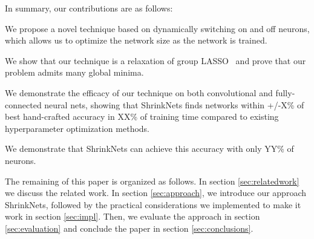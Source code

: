 In summary, our contributions are as follows: 
\begin{compactenum}
\item We propose a novel technique based on dynamically switching on and off neurons, 
which allows us to optimize the network size as the network is trained. 
\item {}
\item We show that our technique is a relaxation of group LASSO~\cite{Yuan2006} and prove that our problem admits many global minima.
\item We demonstrate the efficacy of our technique on both convolutional and fully-connected neural nets,
showing that 
ShrinkNets finds networks within +/-X\% of best hand-crafted accuracy in XX\% of
training time compared to existing hyperparameter optimization methods. 
\item We demonstrate that ShrinkNets can achieve this accuracy with only YY\% 
of neurons. 
\item {}
\item {}
\end{compactenum}

The remaining of this paper is organized as follows. In section
\ref{sec:relatedwork} we discuss the related work. In section
\ref{sec:approach}, we introduce our approach ShrinkNets, followed by the
practical considerations we implemented to make it work in section
\ref{sec:impl}. Then, we evaluate the approach in section \ref{sec:evaluation}
and conclude the paper in section \ref{sec:conclusions}.


